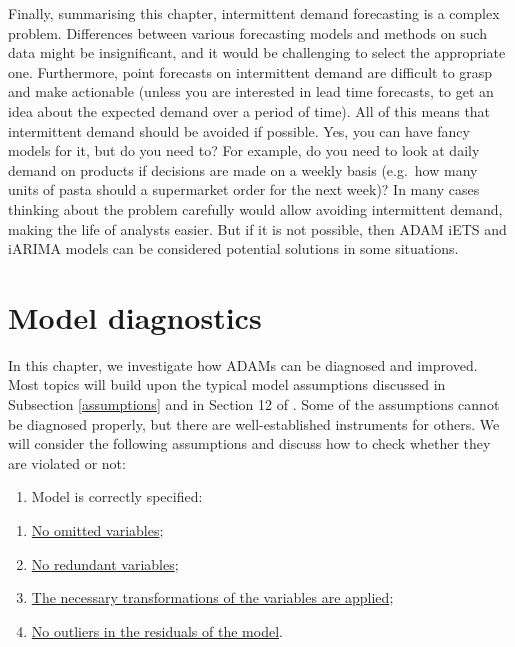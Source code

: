 \documentclass[
]{book}
\providecommand{\tightlist}{%
  \setlength{\itemsep}{0pt}\setlength{\parskip}{0pt}}
\theoremstyle{definition}
\theoremstyle{definition}
\theoremstyle{definition}
\theoremstyle{definition}
\theoremstyle{remark}
\begin{document}
Finally, summarising this chapter, intermittent demand forecasting is a complex problem. Differences between various forecasting models and methods on such data might be insignificant, and it would be challenging to select the appropriate one. Furthermore, point forecasts on intermittent demand are difficult to grasp and make actionable (unless you are interested in lead time forecasts, to get an idea about the expected demand over a period of time). All of this means that intermittent demand should be avoided if possible. Yes, you can have fancy models for it, but do you need to? For example, do you need to look at daily demand on products if decisions are made on a weekly basis (e.g.~how many units of pasta should a supermarket order for the next week)? In many cases thinking about the problem carefully would allow avoiding intermittent demand, making the life of analysts easier. But if it is not possible, then ADAM iETS and iARIMA models can be considered potential solutions in some situations.

\hypertarget{diagnostics}{%
\chapter{Model diagnostics}\label{diagnostics}}

In this chapter, we investigate how ADAMs can be diagnosed and improved. Most topics will build upon the typical model assumptions discussed in Subsection \ref{assumptions} and in Section 12 of \citet{SvetunkovSBA}. Some of the assumptions cannot be diagnosed properly, but there are well-established instruments for others. We will consider the following assumptions and discuss how to check whether they are violated or not:

\begin{enumerate}
\def\labelenumi{\arabic{enumi}.}
\tightlist
\item
  Model is correctly specified:
\end{enumerate}

\begin{enumerate}
\def\labelenumi{\alph{enumi}.}
\tightlist
\item
  \protect\hyperlink{diagnosticsOmitted}{No omitted variables};
\item
  \protect\hyperlink{diagnosticsRedundant}{No redundant variables};
\item
  \protect\hyperlink{diagnosticsTransformations}{The necessary transformations of the variables are applied};
\item
  \protect\hyperlink{diagnosticsOutliers}{No outliers in the residuals of the model}.
\end{enumerate}
\end{document}
